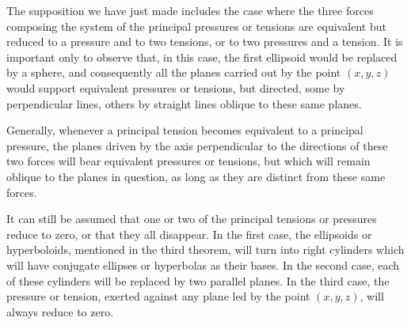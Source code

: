 \documentclass[leqno,openright,smallroyalvopaper,8pt,twoside,showtrims]{memoir}
\begin{document}
The supposition we have just made includes the case where the three forces composing the system of the principal pressures or tensions are equivalent but reduced to a pressure and to two tensions, or to two pressures and a tension. It is important only to observe that, in this case, the first ellipsoid would be replaced by a sphere, and consequently all the planes carried out by the point $(x, y, z)$ would support equivalent pressures or tensions, but directed, some by perpendicular lines, others by straight lines oblique to these same planes.


Generally, whenever a principal tension becomes equivalent to a principal pressure, the planes driven by the axis perpendicular to the directions of these two forces will bear equivalent pressures or tensions, but which will remain oblique to the planes in question, as long as they are distinct from these same forces.

It can still be assumed that one or two of the principal tensions or pressures reduce to zero, or that they all disappear. In the first case, the ellipsoids or hyperboloids, mentioned in the third theorem, will turn into right cylinders which will have conjugate ellipses or hyperbolas as their bases. In the second case, each of these cylinders will be replaced by two parallel planes. In the third case, the pressure or tension, exerted against any plane led by the point $(x, y, z)$, will always reduce to zero.
\end{document}
